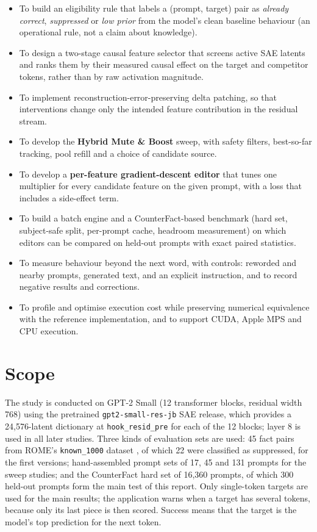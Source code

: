 \documentclass[12pt,a4paper]{report}
\begin{document}
\begin{itemize}
  \item To build an eligibility rule that labels a (prompt, target) pair as \textit{already correct}, \textit{suppressed} or \textit{low prior} from the model's clean baseline behaviour (an operational rule, not a claim about knowledge).
  \item To design a two-stage causal feature selector that screens active SAE latents and ranks them by their measured causal effect on the target and competitor tokens, rather than by raw activation magnitude.
  \item To implement reconstruction-error-preserving delta patching, so that interventions change only the intended feature contribution in the residual stream.
  \item To develop the \textbf{Hybrid Mute \& Boost} sweep, with safety filters, best-so-far tracking, pool refill and a choice of candidate source.
  \item To develop a \textbf{per-feature gradient-descent editor} that tunes one multiplier for every candidate feature on the given prompt, with a loss that includes a side-effect term.
  \item To build a batch engine and a CounterFact-based benchmark (hard set, subject-safe split, per-prompt cache, headroom measurement) on which editors can be compared on held-out prompts with exact paired statistics.
  \item To measure behaviour beyond the next word, with controls: reworded and nearby prompts, generated text, and an explicit instruction, and to record negative results and corrections.
  \item To profile and optimise execution cost while preserving numerical equivalence with the reference implementation, and to support CUDA, Apple MPS and CPU execution.
\end{itemize}

\section{Scope}

The study is conducted on GPT-2 Small (12 transformer blocks, residual width 768) using the pretrained \texttt{gpt2-small-res-jb} SAE release, which provides a 24,576-latent dictionary at \texttt{hook\_\allowbreak{}resid\_\allowbreak{}pre} for each of the 12 blocks; layer 8 is used in all later studies. Three kinds of evaluation sets are used: 45 fact pairs from ROME's \texttt{known\_\allowbreak{}1000} dataset \cite{r2}, of which 22 were classified as suppressed, for the first versions; hand-assembled prompt sets of 17, 45 and 131 prompts for the sweep studies; and the CounterFact \cite{r2} hard set of 16,360 prompts, of which 300 held-out prompts form the main test of this report. Only single-token targets are used for the main results; the application warns when a target has several tokens, because only its last piece is then scored. Success means that the target is the model's top prediction for the next token.
\end{document}
